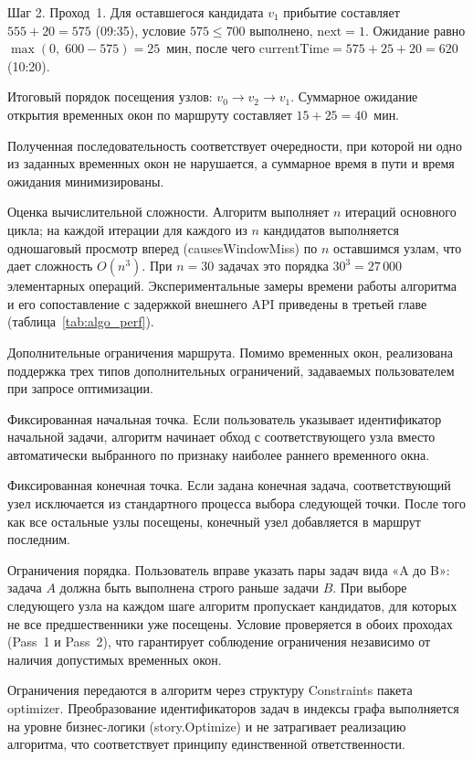 Шаг 2. Проход~1. Для оставшегося кандидата $v_1$ прибытие
составляет $555 + 20 = 575$ (09:35), условие $575 \leq 700$ выполнено,
$\mathrm{next} = 1$. Ожидание равно $\max(0,\; 600 - 575) = 25$~мин,
после чего $\mathrm{currentTime} = 575 + 25 + 20 = 620$ (10:20).

Итоговый порядок посещения узлов: $v_0 \to v_2 \to v_1$. Суммарное
ожидание открытия временных окон по маршруту составляет
$15 + 25 = 40$~мин.

Полученная последовательность соответствует
очередности, при которой ни одно из заданных временных окон не нарушается,
а суммарное время в пути и время ожидания минимизированы.

Оценка вычислительной сложности. Алгоритм выполняет $n$ итераций основного цикла; на каждой итерации
для каждого из $n$ кандидатов выполняется одношаговый просмотр вперед
(causesWindowMiss) по $n$ оставшимся узлам, что дает
сложность $O(n^3)$. При $n = 30$ задачах это порядка $30^3 = 27\,000$ элементарных
операций. Экспериментальные замеры времени работы алгоритма и его сопоставление
с задержкой внешнего API приведены в третьей главе (таблица~\ref{tab:algo_perf}).

Дополнительные ограничения маршрута. Помимо временных окон, реализована поддержка трех типов дополнительных ограничений,
задаваемых пользователем при запросе оптимизации.

Фиксированная начальная точка.
Если пользователь указывает идентификатор начальной задачи, алгоритм начинает обход
с соответствующего узла вместо автоматически выбранного по признаку наиболее раннего
временного окна.

Фиксированная конечная точка.
Если задана конечная задача, соответствующий узел исключается из стандартного процесса
выбора следующей точки.
После того как все остальные узлы посещены, конечный узел добавляется в маршрут последним.

Ограничения порядка.
Пользователь вправе указать пары задач вида «A до B»:
задача $A$ должна быть выполнена строго раньше задачи $B$.
При выборе следующего узла на каждом шаге алгоритм пропускает кандидатов,
для которых не все предшественники уже посещены.
Условие проверяется в обоих проходах (Pass~1 и Pass~2), что гарантирует
соблюдение ограничения независимо от наличия допустимых временных окон.

Ограничения передаются в алгоритм через структуру Constraints пакета
optimizer.
Преобразование идентификаторов задач в индексы графа выполняется на уровне
бизнес-логики (story.Optimize) и не затрагивает реализацию алгоритма,
что соответствует принципу единственной ответственности.

